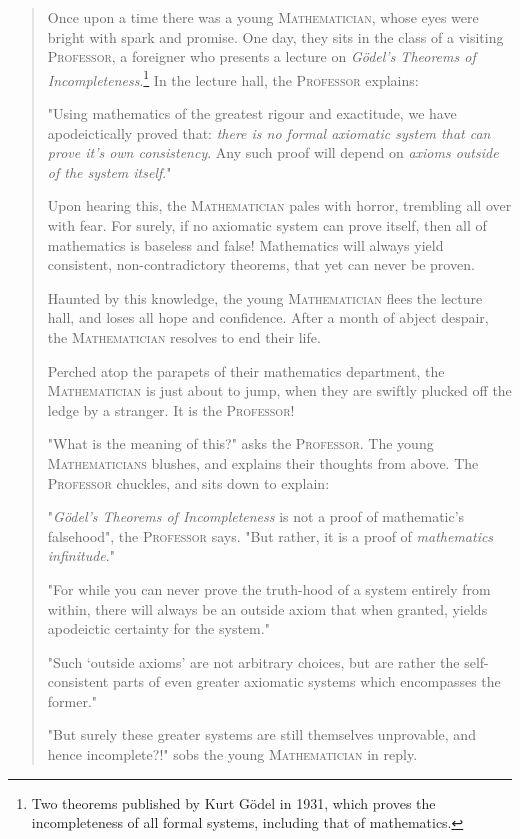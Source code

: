 \begin{quote}
  Once upon a time there was a young \textsc{Mathematician}, whose eyes were bright with spark and promise. One day, they sits in the class of a visiting \textsc{Professor}, a foreigner who presents a lecture on \emph{Gödel's Theorems of Incompleteness}.\footnote{Two theorems published by Kurt Gödel in 1931, which proves the incompleteness of all formal systems, including that of mathematics.} In the lecture hall, the \textsc{Professor} explains:

  "Using mathematics of the greatest rigour and exactitude, we have apodeictically proved that: \emph{there is no formal axiomatic system that can prove it's own consistency}. Any such proof will depend on \emph{axioms outside of the system itself}."

  Upon hearing this, the \textsc{Mathematician} pales with horror, trembling all over with fear. For surely, if no axiomatic system can prove itself, then all of mathematics is baseless and false! Mathematics will always yield consistent, non-contradictory theorems, that yet can never be proven.

  Haunted by this knowledge, the young \textsc{Mathematician} flees the lecture hall, and loses all hope and confidence. After a month of abject despair, the \textsc{Mathematician} resolves to end their life.

  Perched atop the parapets of their mathematics department, the \textsc{Mathematician} is just about to jump, when they are swiftly plucked off the ledge by a stranger. It is the \textsc{Professor}!

  "What is the meaning of this?" asks the \textsc{Professor}. The young \textsc{Mathematicians} blushes, and explains their thoughts from above. The \textsc{Professor} chuckles, and sits down to explain:

  "\emph{Gödel's Theorems of Incompleteness} is not a proof of mathematic's falsehood", the \textsc{Professor} says. "But rather, it is a proof of \emph{mathematics infinitude}."

  "For while you can never prove the truth-hood of a system entirely from within, there will always be an outside axiom that when granted, yields apodeictic certainty for the system."

  "Such `outside axioms' are not arbitrary choices, but are rather the self-consistent parts of even greater axiomatic systems which encompasses the former."

  "But surely these greater systems are still themselves unprovable, and hence incomplete?!" sobs the young \textsc{Mathematician} in reply.


\end{quote}
